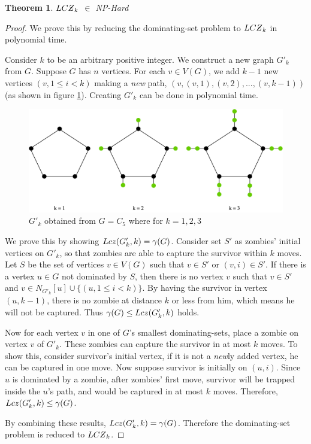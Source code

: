 \documentclass[1p]{elsarticle}
\newtheorem{theorem}{Theorem}
\newcommand{\NPZ}{\ooalign{$Z$\cr\hfil\rule[.8ex]{.3em}{.09ex}\hfil\cr}}
\newcommand{\zn}{\ooalign{$z$\cr\hfil\rule[.5ex]{.2em}{.08ex}\hfil\cr}}
\begin{document}
	\begin{theorem}
		$LC\NPZ_k$ $\in$ NP-Hard
	\end{theorem}
	\begin{proof}
		We prove this by reducing the dominating-set problem to $LC\NPZ_k$ in polynomial time.

		Consider $k$ to be an arbitrary positive integer. We construct a new graph $G'_k$ from $G$. Suppose $G$
		has $n$ vertices. For each $v \in V(G)$, we add $k-1$ new vertices $(v,1 \leq i < k)$ making a {\it new} path,
		$(v,(v,1),(v,2),...,(v,k-1))$ (as shown in figure \ref{fig:p7}). Creating $G'_k$ can be done in polynomial time.

		\begin{figure}[h!]
			\centering
			\includegraphics[width=0.9\linewidth]{fig/LCZ.png}
			\caption{$G'_k$ obtained from $G = C_5$ where for $k = 1,2,3$}
			\label{fig:p7}
		\end{figure}		


		We prove this by showing $Lc\zn(G'_k,k) = \gamma(G)$. Consider set $S'$ as zombies' initial vertices on $G'_k$,
		so that zombies are able to capture the survivor within $k$ moves. Let $S$ be the set of vertices $v \in V(G)$
		such that $v \in S'$ or $(v,i) \in S'$. If there is a vertex $u \in G$ not dominated by $S$, then there is no
		vertex $v$ such that $v \in S'$ and $v \in N_{G'_k}[u] \cup \{(u,1 \leq i < k)\}$. By having the survivor in
		vertex $(u, k-1)$, there is no zombie at distance $k$ or less from him, which means he will not be captured.
		Thus $\gamma(G) \leq Lc\zn(G'_k,k)$ holds.
		
		Now for each vertex $v$ in one of $G$'s smallest dominating-sets, place a zombie on vertex $v$ of $G'_k$. These
		zombies can capture the survivor in at most $k$ moves. To show this, consider survivor's initial vertex, if it
		is not a {\it new}ly added vertex, he can be captured in one move. Now suppose survivor is initially on $(u,i)$. Since
		$u$ is dominated by a zombie, after zombies' first move, survivor will be trapped inside the $u$'s path, and would
		be captured in at most $k$ moves. Therefore, $Lc\zn(G'_k,k) \leq \gamma(G)$.

		By combining these results, $Lc\zn(G'_k,k) = \gamma(G)$. Therefore the dominating-set problem is reduced to
		$LC\NPZ_k$.

	\end{proof}
\end{document}
